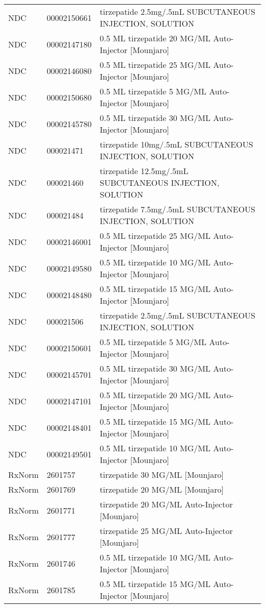 \begin{longtable}{p{}p{}p{}}
  NDC & 00002150661 & tirzepatide 2.5mg/.5mL SUBCUTANEOUS INJECTION, SOLUTION \\ 
  NDC & 00002147180 & 0.5 ML tirzepatide 20 MG/ML Auto-Injector [Mounjaro] \\ 
  NDC & 00002146080 & 0.5 ML tirzepatide 25 MG/ML Auto-Injector [Mounjaro] \\ 
  NDC & 00002150680 & 0.5 ML tirzepatide 5 MG/ML Auto-Injector [Mounjaro] \\ 
  NDC & 00002145780 & 0.5 ML tirzepatide 30 MG/ML Auto-Injector [Mounjaro] \\ 
  NDC & 000021471 & tirzepatide 10mg/.5mL SUBCUTANEOUS INJECTION, SOLUTION \\ 
  NDC & 000021460 & tirzepatide 12.5mg/.5mL SUBCUTANEOUS INJECTION, SOLUTION \\ 
  NDC & 000021484 & tirzepatide 7.5mg/.5mL SUBCUTANEOUS INJECTION, SOLUTION \\ 
  NDC & 00002146001 & 0.5 ML tirzepatide 25 MG/ML Auto-Injector [Mounjaro] \\ 
  NDC & 00002149580 & 0.5 ML tirzepatide 10 MG/ML Auto-Injector [Mounjaro] \\ 
  NDC & 00002148480 & 0.5 ML tirzepatide 15 MG/ML Auto-Injector [Mounjaro] \\ 
  NDC & 000021506 & tirzepatide 2.5mg/.5mL SUBCUTANEOUS INJECTION, SOLUTION \\ 
  NDC & 00002150601 & 0.5 ML tirzepatide 5 MG/ML Auto-Injector [Mounjaro] \\ 
  NDC & 00002145701 & 0.5 ML tirzepatide 30 MG/ML Auto-Injector [Mounjaro] \\ 
  NDC & 00002147101 & 0.5 ML tirzepatide 20 MG/ML Auto-Injector [Mounjaro] \\ 
  NDC & 00002148401 & 0.5 ML tirzepatide 15 MG/ML Auto-Injector [Mounjaro] \\ 
  NDC & 00002149501 & 0.5 ML tirzepatide 10 MG/ML Auto-Injector [Mounjaro] \\ 
  RxNorm & 2601757 & tirzepatide 30 MG/ML [Mounjaro] \\ 
  RxNorm & 2601769 & tirzepatide 20 MG/ML [Mounjaro] \\ 
  RxNorm & 2601771 & tirzepatide 20 MG/ML Auto-Injector [Mounjaro] \\ 
  RxNorm & 2601777 & tirzepatide 25 MG/ML Auto-Injector [Mounjaro] \\ 
  RxNorm & 2601746 & 0.5 ML tirzepatide 10 MG/ML Auto-Injector [Mounjaro] \\ 
  RxNorm & 2601785 & 0.5 ML tirzepatide 15 MG/ML Auto-Injector [Mounjaro] \\ 

\end{longtable}

